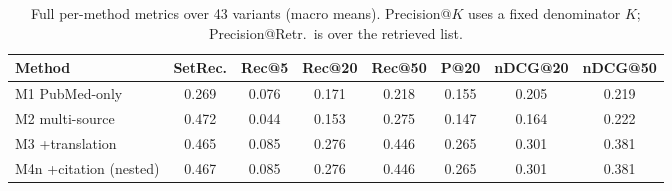 \begin{table}[h]
\centering\small
\caption{Full per-method metrics over 43 variants (macro means). Precision@$K$ uses a fixed denominator $K$; Precision@Retr.\ is over the retrieved list.}
\label{tab:supp-metrics}
\begin{tabular}{lccccccc}
\toprule
Method & SetRec. & Rec@5 & Rec@20 & Rec@50 & P@20 & nDCG@20 & nDCG@50 \\
\midrule
M1 PubMed-only & 0.269 & 0.076 & 0.171 & 0.218 & 0.155 & 0.205 & 0.219 \\
M2 multi-source & 0.472 & 0.044 & 0.153 & 0.275 & 0.147 & 0.164 & 0.222 \\
M3 +translation & 0.465 & 0.085 & 0.276 & 0.446 & 0.265 & 0.301 & 0.381 \\
M4n +citation (nested) & 0.467 & 0.085 & 0.276 & 0.446 & 0.265 & 0.301 & 0.381 \\
\bottomrule
\end{tabular}
\end{table}
